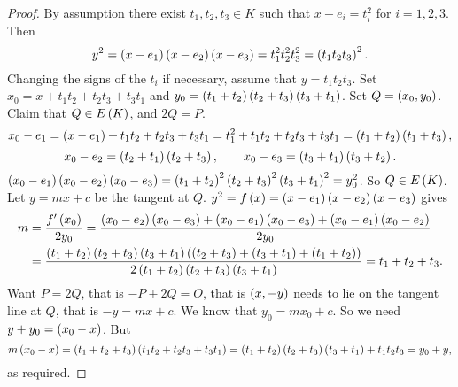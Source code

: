 \begin{proof}
By assumption there exist $ t_1, t_2, t_3 \in K $ such that $ x - e_i = t_i^2 $ for $ i = 1, 2, 3 $. Then
$$ y^2 = \left( x - e_1 \right)\left( x - e_2 \right)\left( x - e_3 \right) = t_1^2t_2^2t_3^2 = \left( t_1t_2t_3 \right)^2. $$
Changing the signs of the $ t_i $ if necessary, assume that $ y = t_1t_2t_3 $. Set $ x_0 = x + t_1t_2 + t_2t_3 + t_3t_1 $ and $ y_0 = \left( t_1 + t_2 \right)\left( t_2 + t_3 \right)\left( t_3 + t_1 \right) $. Set $ Q = \left( x_0, y_0 \right) $. Claim that $ Q \in E\left( K \right) $, and $ 2Q = P $.
$$ x_0 - e_1 = \left( x - e_1 \right) + t_1t_2 + t_2t_3 + t_3t_1 = t_1^2 + t_1t_2 + t_2t_3 + t_3t_1 = \left( t_1 + t_2 \right)\left( t_1 + t_3 \right), $$
$$ x_0 - e_2 = \left( t_2 + t_1 \right)\left( t_2 + t_3 \right), \qquad x_0 - e_3 = \left( t_3 + t_1 \right)\left( t_3 + t_2 \right). $$
$ \left( x_0 - e_1 \right)\left( x_0 - e_2 \right)\left( x_0 - e_3 \right) = \left( t_1 + t_2 \right)^2\left( t_2 + t_3 \right)^2\left( t_3 + t_1 \right)^2 = y_0^2 $. So $ Q \in E\left( K \right) $. Let $ y = mx + c $ be the tangent at $ Q $. $ y^2 = f\left( x \right) = \left( x - e_1 \right)\left( x - e_2 \right)\left( x - e_3 \right) $ gives
\begin{align*}
m
& = \dfrac{f'\left( x_0 \right)}{2y_0} = \dfrac{\left( x_0 - e_2 \right)\left( x_0 - e_3 \right) + \left( x_0 - e_1 \right)\left( x_0 - e_3 \right) + \left( x_0 - e_1 \right)\left( x_0 - e_2 \right)}{2y_0} \\
& = \dfrac{\left( t_1 + t_2 \right)\left( t_2 + t_3 \right)\left( t_3 + t_1 \right)\left( \left( t_2 + t_3 \right) + \left( t_3 + t_1 \right) + \left( t_1 + t_2 \right) \right)}{2\left( t_1 + t_2 \right)\left( t_2 + t_3 \right)\left( t_3 + t_1 \right)} = t_1 + t_2 + t_3.
\end{align*}
Want $ P = 2Q $, that is $ -P + 2Q = O $, that is $ \left( x, -y \right) $ needs to lie on the tangent line at $ Q $, that is $ -y = mx + c $. We know that $ y_0 = mx_0 + c $. So we need $ y + y_0 = \left( x_0 - x \right) $. But
$$ m\left( x_0 - x \right) = \left( t_1 + t_2 + t_3 \right)\left( t_1t_2 + t_2t_3 + t_3t_1 \right) = \left( t_1 + t_2 \right)\left( t_2 + t_3 \right)\left( t_3 + t_1 \right) + t_1t_2t_3 = y_0 + y, $$
as required.
\end{proof}


